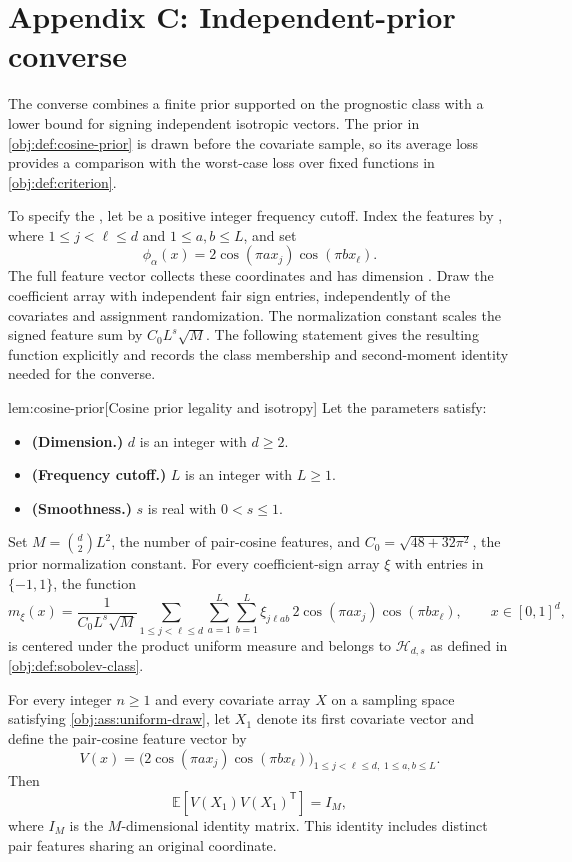 \section{Appendix C: Independent-prior converse}

The converse combines a finite prior supported on the prognostic class with a lower bound for signing independent isotropic vectors. The prior in \cref{obj:def:cosine-prior} is drawn before the covariate sample, so its average loss provides a comparison with the worst-case loss over fixed functions in \cref{obj:def:criterion}.

To specify the , let  be a positive integer frequency cutoff. Index the features by , where \(1\leq j<\ell\leq d\) and \(1\leq a,b\leq L\), and set
\[
\phi_\alpha(x)=2\cos(\pi a x_j)\cos(\pi b x_\ell).
\]
The full feature vector  collects these coordinates and has dimension . Draw the coefficient array  with independent fair sign entries, independently of the covariates and assignment randomization. The normalization constant  scales the signed feature sum by \(C_0L^s\sqrt M\). The following statement gives the resulting function explicitly and records the class membership and second-moment identity needed for the converse.

\begin{lemmav}{lem:cosine-prior}[Cosine prior legality and isotropy]
Let the parameters satisfy:
\begin{itemize}
\item \textbf{(Dimension.)} \(d\) is an integer with \(d\geq2\).
\item \textbf{(Frequency cutoff.)} \(L\) is an integer with \(L\geq1\).
\item \textbf{(Smoothness.)} \(s\) is real with \(0<s\leq1\).
\end{itemize}
Set \(M=\binom{d}{2}L^2\), the number of pair-cosine features, and \(C_0=\sqrt{48+32\pi^2}\), the prior normalization constant. For every coefficient-sign array \(\xi\) with entries in \(\{-1,1\}\), the function
\[
m_\xi(x)=
\frac{1}{C_0L^s\sqrt M}
\sum_{1\leq j<\ell\leq d}\sum_{a=1}^{L}\sum_{b=1}^{L}
\xi_{j\ell ab}\,2\cos(\pi a x_j)\cos(\pi b x_\ell),
\qquad x\in[0,1]^d,
\]
is centered under the product uniform measure and belongs to \(\mathcal H_{d,s}\) as defined in \cref{obj:def:sobolev-class}.

For every integer \(n\geq1\) and every covariate array \(X\) on a sampling space satisfying \cref{obj:ass:uniform-draw}, let \(X_1\) denote its first covariate vector and define the pair-cosine feature vector by
\[
V(x)=
\bigl(2\cos(\pi a x_j)\cos(\pi b x_\ell)\bigr)_{
1\leq j<\ell\leq d,\;1\leq a,b\leq L}.
\]
Then
\[
\mathbb E\!\left[V(X_1)V(X_1)^{\mathsf T}\right]=I_M,
\]
where \(I_M\) is the \(M\)-dimensional identity matrix. This identity includes distinct pair features sharing an original coordinate.
\end{lemmav}

